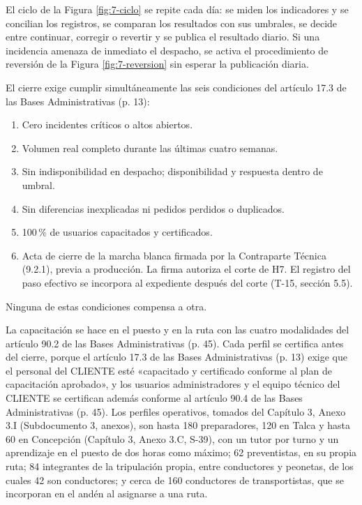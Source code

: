 El ciclo de la Figura \ref{fig:7-ciclo} se repite cada día: se miden los indicadores y se concilian los registros, se comparan los resultados con sus umbrales, se decide entre continuar, corregir o revertir y se publica el resultado diario. Si una incidencia amenaza de inmediato el despacho, se activa el procedimiento de reversión de la Figura \ref{fig:7-reversion} sin esperar la publicación diaria.

El cierre exige cumplir simultáneamente las seis condiciones del artículo 17.3 de las Bases Administrativas (p. 13):

\begin{enumerate}
  \item Cero incidentes críticos o altos abiertos.
  \item Volumen real completo durante las últimas cuatro semanas.
  \item Sin indisponibilidad en despacho; disponibilidad y respuesta dentro de umbral.
  \item Sin diferencias inexplicadas ni pedidos perdidos o duplicados.
  \item 100\,\% de usuarios capacitados y certificados.
  \item Acta de cierre de la marcha blanca firmada por la Contraparte Técnica (9.2.1), previa a producción. La firma autoriza el corte de H7. El registro del paso efectivo se incorpora al expediente después del corte (T-15, sección 5.5).
\end{enumerate}

Ninguna de estas condiciones compensa a otra.

La capacitación se hace en el puesto y en la ruta con las cuatro modalidades del artículo 90.2 de las Bases Administrativas (p. 45). Cada perfil se certifica antes del cierre, porque el artículo 17.3 de las Bases Administrativas (p. 13) exige que el personal del CLIENTE esté «capacitado y certificado conforme al plan de capacitación aprobado», y los usuarios administradores y el equipo técnico del CLIENTE se certifican además conforme al artículo 90.4 de las Bases Administrativas (p. 45). Los perfiles operativos, tomados del Capítulo 3, Anexo 3.I (Subdocumento 3, anexos), son hasta 180 preparadores, 120 en Talca y hasta 60 en Concepción (Capítulo 3, Anexo 3.C, S-39), con un tutor por turno y un aprendizaje en el puesto de dos horas como máximo; 62 preventistas, en su propia ruta; 84 integrantes de la tripulación propia, entre conductores y peonetas, de los cuales 42 son conductores; y cerca de 160 conductores de transportistas, que se incorporan en el andén al asignarse a una ruta.

